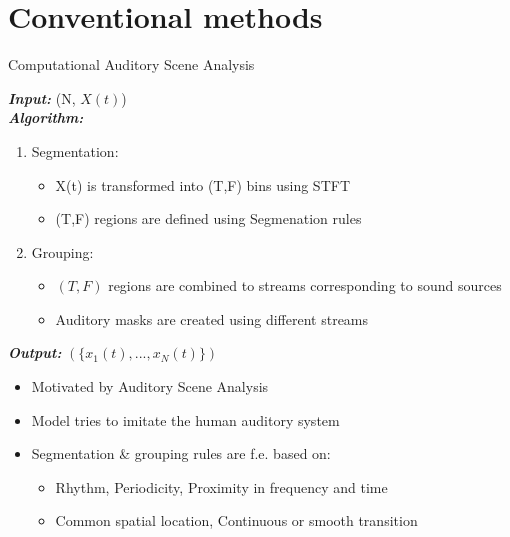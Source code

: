 \documentclass[xcolor=table,mathserif,9pt]{beamer}    %
\begin{document}
\section{Conventional methods}%
\label{sec:conventional_methods}
\begin{frame}{Computational Auditory Scene Analysis \cite{CASABrown}}

\begin{algorithm}[H]
	\LinesNumbered
	\emph{\textbf{Input: }}(N, $X(t)$) \\
	\emph{\textbf{Algorithm: }}
	\begin{enumerate}
		\item Segmentation:
			\begin{itemize}
				\item \small{ X(t) is transformed into (T,F) bins using STFT }
				\item (T,F) regions are defined using Segmenation rules 
			\end{itemize}
		\item Grouping:
			\begin{itemize}
				\item \small{ $(T,F)$ regions are combined to streams corresponding to sound sources}
				\item Auditory masks are created using different streams
			\end{itemize}
	\end{enumerate}
	\emph{\textbf{Output: }}$(\{x_1(t), ..., x_N(t)\})$
\end{algorithm}
	\vspace{10mm}
\begin{itemize}
	\item Motivated by Auditory Scene Analysis \cite{bregman}
	\item Model tries to imitate the human auditory system
	\item Segmentation \& grouping rules are f.e. based on:
	\begin{itemize}
		\item Rhythm, Periodicity, Proximity in frequency and time
		\item Common spatial location, Continuous or smooth transition
	\end{itemize}
\end{itemize}

\end{frame}
\end{document}
